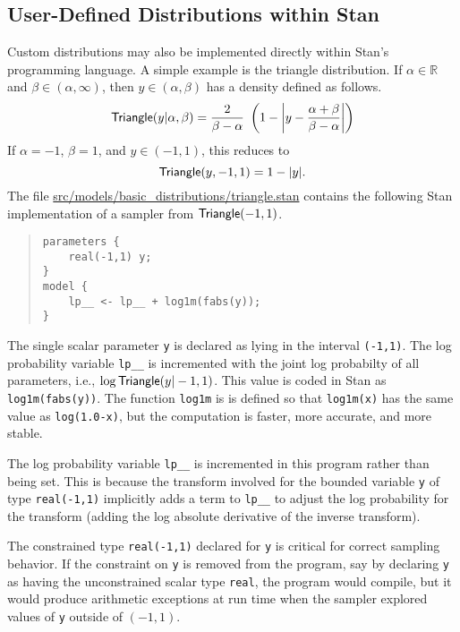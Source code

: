 \documentclass[10pt]{report}
\newcommand{\Stan}{Stan\xspace}
\newcommand{\code}[1]{{\tt #1}}
\newcommand{\distro}[1]{\mbox{\sf #1}}
\newcommand{\reals}{\mathbb{R}}
\begin{document}
\subsection{User-Defined Distributions within \Stan}

Custom distributions may also be implemented directly within \Stan's
programming language.  A simple example is the triangle distribution.
If $\alpha \in \reals$ and $\beta \in (\alpha,\infty)$, then
$y \in (\alpha,\beta)$ has a density defined as follows.
\[
\distro{Triangle}(y | \alpha,\beta)
= 
\frac{2}{\beta - \alpha}
\
\left(
1 - 
\left|
y - \frac{\alpha + \beta}{\beta - \alpha}
\right|
\right)
\]
%
If $\alpha = -1$, $\beta = 1$, and $y \in (-1,1)$, this reduces to
\[
\distro{Triangle}(y,-1,1) = 1 - |y|.
\]
The file \url{src/models/basic_distributions/triangle.stan} contains
the following \Stan implementation of a sampler from 
$\distro{Triangle}(-1,1)$.
%
\begin{quote}
\begin{Verbatim}
parameters {
    real(-1,1) y;
}
model {
    lp__ <- lp__ + log1m(fabs(y));
}
\end{Verbatim}
\end{quote}
%
The single scalar parameter \code{y} is declared as lying in the
interval \code{(-1,1)}.  The log probability variable \code{lp\_\_} is
incremented with the joint log probabilty of all parameters, i.e.,
$\log \distro{Triangle}(y|-1,1)$.  This value is coded in \Stan as
\code{log1m(fabs(y))}.  The function \code{log1m} is is defined so
that \code{log1m(x)} has the same value as \code{log(1.0-x)}, but the
computation is faster, more accurate, and more stable.

The log probability variable \code{lp\_\_} is incremented in this
program rather than being set.  This is because the transform involved
for the bounded variable \code{y} of type \code{real(-1,1)} implicitly
adds a term to \code{lp\_\_} to adjust the log probability for the
transform (adding the log absolute derivative of the inverse
transform).

The constrained type \code{real(-1,1)} declared for \code{y} is
critical for correct sampling behavior.  If the constraint on \code{y}
is removed from the program, say by declaring \code{y} as having the
unconstrained scalar type \code{real}, the program would compile, but
it would produce arithmetic exceptions at run time when the sampler
explored values of \code{y} outside of $(-1,1)$.
\end{document}
